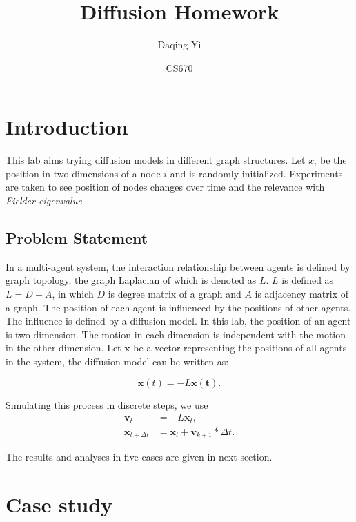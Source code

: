 \documentclass[12pt]{article}
\begin{document}
\title{\textsf{Diffusion Homework}}
\author{\textsf{Daqing Yi}}
\date{\textsf{CS670}}

\maketitle

\section{Introduction}

This lab aims trying diffusion models in different graph structures. Let $ x_{i} $ be the position in two dimensions of a node $ i $ and is randomly initialized. Experiments are taken to see position of nodes changes over time and the relevance with \emph{Fielder eigenvalue}.

\subsection{Problem Statement}

In a multi-agent system, the interaction relationship between agents is defined by graph topology, the graph Laplacian of which is denoted as $ L $. $ L $ is defined as $ L = D - A $, in which $ D $ is degree matrix of a graph and $ A $ is adjacency matrix of a graph. The position of each agent is influenced by the positions of other agents. The influence is defined by a diffusion model. In this lab, the position of an agent is two dimension. The motion in each dimension is independent with the motion in the other dimension. Let $ \mathbf{x} $ be a vector representing the positions of all agents in the system, the diffusion model can be written as:

\begin{equation}
\dot{\mathbf{x}}(t) = - L \mathbf{x(t)}.
\end{equation}

Simulating this process in discrete steps, we use
\begin{equation}
\begin{aligned}
\mathbf{v}_{t} & = - L \mathbf{x}_{t}, \\
\mathbf{x}_{t+\Delta t} & = \mathbf{x}_{t} + \mathbf{v}_{k+1} * \Delta t.
\end{aligned}
\end{equation}

The results and analyses in five cases are given in next section.

\section{Case study}
\end{document}
